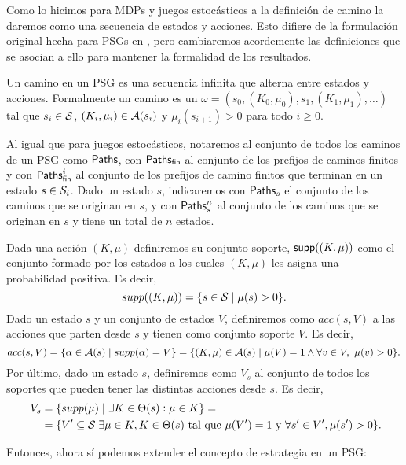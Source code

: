 Como lo hicimos para MDPs y juegos estocásticos a la definición de camino la
daremos como una secuencia de estados y acciones. Esto difiere de la
formulación original hecha para PSGs en \cite{Polytopal}, pero cambiaremos
acordemente las definiciones que se asocian a ello para mantener la formalidad
de los resultados.

\begin{definition}
	Un camino en un PSG es una secuencia infinita que alterna entre estados y acciones. Formalmente un camino es un $\omega = (s_0, (K_0, \mu_0), s_1, (K_1, \mu_1), \dots)$ tal que $s_i \in \mathcal{S}$, $(K_i, \mu_i) \in \mathcal{A}(s_i)$ y $\mu_i(s_{i+1}) > 0$ para todo $i \geq 0$.

	Al igual que para juegos estocásticos, notaremos al conjunto de todos los
	caminos de un PSG como $\textsf{Paths}$, con $\textsf{Paths}_\textsf{fin}$ al conjunto de los prefijos de
	caminos finitos y con $\textsf{Paths}_\textsf{fin}^i$ al conjunto de los prefijos de camino
	finitos que terminan en un estado $s \in \mathcal{S}_i$. Dado un estado $s$,
	indicaremos con $\textsf{Paths}_s$ el conjunto de los caminos que se originan en $s$, y
	con $\textsf{Paths}_s^n$ al conjunto de los caminos que se originan en $s$ y tiene un
	total de $n$ estados.
\end{definition}

\begin{definition}
	Dada una acción $(K, \mu)$ definiremos su conjunto soporte, $\textsf{supp}((K, \mu))$ como el conjunto formado por los estados a los cuales $(K, \mu)$ les asigna una probabilidad positiva. Es decir,
	$$supp((K, \mu)) = \{s \in \mathcal{S} \mid \mu(s) > 0\}.$$
	Dado un estado $s$ y un conjunto de estados $V$, definiremos como $acc(s, V)$ a
	las acciones que parten desde $s$ y tienen como conjunto soporte $V$. Es decir,
	$$acc(s, V) = \{\alpha \in \mathcal{A}(s) \mid supp(\alpha) = V\} = \{(K, \mu) \in \mathcal{A}(s) \mid \mu(V) = 1 \wedge \forall v \in V, \ \mu(v) > 0\}.$$
	Por último, dado un estado $s$, definiremos como $V_s$ al conjunto de todos los
	soportes que pueden tener las distintas acciones desde $s$. Es decir,
	\begin{align*}~\label{definicionVs}
		V_s &= \{supp(\mu) \mid \exists K \in \Theta(s): \mu \in K\} = \\
		&= \{V' \subseteq \mathcal{S} | \exists \mu \in K, K \in \Theta(s) \text{ tal que } \mu(V') = 1 \text{ y } \forall s' \in V', \mu(s') > 0\}.
	\end{align*}
\end{definition}

Entonces, ahora sí podemos extender el concepto de estrategia en un PSG:

